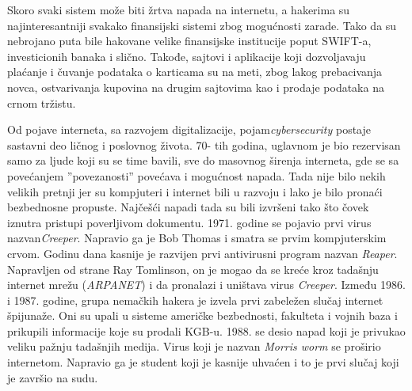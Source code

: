\documentclass[a4paper]{article}
\begin{document}
{Skoro svaki sistem može biti žrtva napada na internetu, a hakerima su najinteresantniji svakako finansijski sistemi zbog mogućnosti zarade. Tako da su nebrojano puta bile hakovane velike finansijske institucije poput SWIFT-a, investicionih banaka i slično. Takođe, sajtovi i aplikacije koji dozvoljavaju plaćanje i čuvanje podataka o karticama su na meti, zbog lakog prebacivanja novca, ostvarivanja kupovina na drugim sajtovima kao i prodaje podataka na crnom tržistu.

Od pojave interneta, sa razvojem digitalizacije, pojam{\em cybersecurity} postaje sastavni deo ličnog i poslovnog života. 70- tih godina, uglavnom je bio rezervisan samo za ljude koji su se time bavili, sve do masovnog širenja interneta, gde se sa povećanjem ''povezanosti'' povećava i mogućnost napada. Tada nije bilo nekih velikih pretnji jer su kompjuteri i internet bili u razvoju i lako je bilo pronaći bezbednosne propuste. Najčešći napadi tada su bili izvršeni tako što čovek iznutra pristupi poverljivom dokumentu. 
1971. godine se pojavio prvi virus nazvan{\em Creeper}. Napravio ga je Bob Thomas i smatra se prvim kompjuterskim crvom.
Godinu dana kasnije je razvijen prvi antivirusni program nazvan {\em Reaper}. Napravljen od strane Ray Tomlinson, on je mogao da se kreće kroz tadašnju internet mrežu ({\em ARPANET}) i da pronalazi i uništava virus {\em Creeper}. 
Između 1986. i 1987. godine, grupa nemačkih hakera je izvela prvi zabeležen slučaj internet špijunaže. Oni su upali u sisteme američke bezbednosti, fakulteta i vojnih baza i prikupili informacije koje su prodali KGB-u.
1988. se desio napad koji je privukao veliku pažnju tadašnjih medija. Virus koji je nazvan {\em Morris worm} se proširio internetom. Napravio ga je student koji je kasnije uhvaćen i to je prvi slučaj koji je završio na sudu.\cite{computersecurity}


\newpage

}
\end{document}
